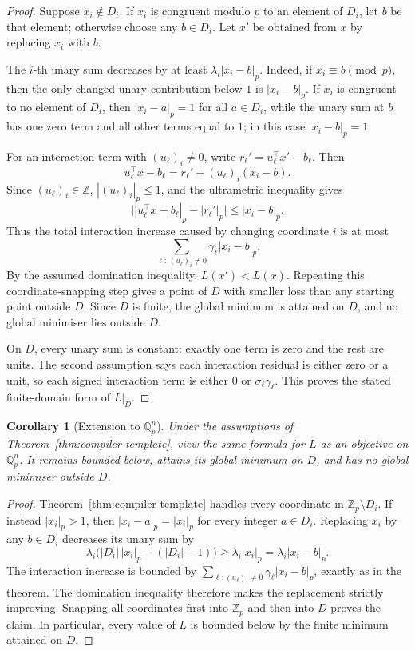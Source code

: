 \documentclass[11pt]{article}
\newtheorem{corollary}[theorem]{Corollary}
\begin{document}
\begin{proof}
Suppose \(x_i\notin D_i\). If \(x_i\) is congruent modulo \(p\) to an element of \(D_i\), let \(b\) be that element; otherwise choose any \(b\in D_i\). Let \(x'\) be obtained from \(x\) by replacing \(x_i\) with \(b\).

The \(i\)-th unary sum decreases by at least \(\lambda_i|x_i-b|_p\). Indeed, if \(x_i\equiv b\pmod p\), then the only changed unary contribution below \(1\) is \(|x_i-b|_p\). If \(x_i\) is congruent to no element of \(D_i\), then \(|x_i-a|_p=1\) for all \(a\in D_i\), while the unary sum at \(b\) has one zero term and all other terms equal to \(1\); in this case \(|x_i-b|_p=1\).

For an interaction term with \((u_\ell)_i\neq0\), write \(r_\ell'=u_\ell^\top x'-b_\ell\). Then
\[
u_\ell^\top x-b_\ell=r_\ell'+(u_\ell)_i(x_i-b).
\]
Since \((u_\ell)_i\in\mathbb Z\), \(|(u_\ell)_i|_p\le1\), and the ultrametric inequality gives
\[
\bigl||u_\ell^\top x-b_\ell|_p-|r_\ell'|_p\bigr|
\le |x_i-b|_p.
\]
Thus the total interaction increase caused by changing coordinate \(i\) is at most
\[
\sum_{\ell:\,(u_\ell)_i\neq0}\gamma_\ell |x_i-b|_p.
\]
By the assumed domination inequality, \(L(x')<L(x)\). Repeating this coordinate-snapping step gives a point of \(D\) with smaller loss than any starting point outside \(D\). Since \(D\) is finite, the global minimum is attained on \(D\), and no global minimiser lies outside \(D\).

On \(D\), every unary sum is constant: exactly one term is zero and the rest are units. The second assumption says each interaction residual is either zero or a unit, so each signed interaction term is either \(0\) or \(\sigma_\ell\gamma_\ell\). This proves the stated finite-domain form of \(L|_D\).
\end{proof}

\begin{corollary}[Extension to \(\mathbb Q_p^n\)]
\label{cor:qp-extension}
Under the assumptions of Theorem~\ref{thm:compiler-template}, view the same formula for \(L\) as an objective on \(\mathbb Q_p^n\). It remains bounded below, attains its global minimum on \(D\), and has no global minimiser outside \(D\).
\end{corollary}

\begin{proof}
Theorem~\ref{thm:compiler-template} handles every coordinate in \(\mathbb Z_p\setminus D_i\). If instead \(|x_i|_p>1\), then \(|x_i-a|_p=|x_i|_p\) for every integer \(a\in D_i\). Replacing \(x_i\) by any \(b\in D_i\) decreases its unary sum by
\[
\lambda_i\bigl(|D_i|\,|x_i|_p-(|D_i|-1)\bigr)
\geq \lambda_i|x_i|_p
=\lambda_i|x_i-b|_p.
\]
The interaction increase is bounded by \(\sum_{\ell:(u_\ell)_i\neq0}\gamma_\ell|x_i-b|_p\), exactly as in the theorem. The domination inequality therefore makes the replacement strictly improving. Snapping all coordinates first into \(\mathbb Z_p\) and then into \(D\) proves the claim. In particular, every value of \(L\) is bounded below by the finite minimum attained on \(D\).
\end{proof}
\end{document}
